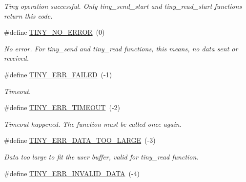 \begin{DoxyCompactItemize}
\begin{DoxyCompactList}\small\item\em Tiny operation successful. Only tiny\+\_\+send\+\_\+start and tiny\+\_\+read\+\_\+start functions return this code. \end{DoxyCompactList}\item 
\hypertarget{group__ERROR__FLAGS_ga69c869a686b67bf0b7b8115599515d61}{}\#define \hyperlink{group__ERROR__FLAGS_ga69c869a686b67bf0b7b8115599515d61}{T\+I\+N\+Y\+\_\+\+N\+O\+\_\+\+E\+R\+R\+O\+R}~(0)\label{group__ERROR__FLAGS_ga69c869a686b67bf0b7b8115599515d61}

\begin{DoxyCompactList}\small\item\em No error. For tiny\+\_\+send and tiny\+\_\+read functions, this means, no data sent or received. \end{DoxyCompactList}\item 
\hypertarget{group__ERROR__FLAGS_ga84e6ca143550038e1a71cf36078d1926}{}\#define \hyperlink{group__ERROR__FLAGS_ga84e6ca143550038e1a71cf36078d1926}{T\+I\+N\+Y\+\_\+\+E\+R\+R\+\_\+\+F\+A\+I\+L\+E\+D}~(-\/1)\label{group__ERROR__FLAGS_ga84e6ca143550038e1a71cf36078d1926}

\begin{DoxyCompactList}\small\item\em Timeout. \end{DoxyCompactList}\item 
\hypertarget{group__ERROR__FLAGS_gac9ba8076a1eb8613e8d1f07629ff0cd1}{}\#define \hyperlink{group__ERROR__FLAGS_gac9ba8076a1eb8613e8d1f07629ff0cd1}{T\+I\+N\+Y\+\_\+\+E\+R\+R\+\_\+\+T\+I\+M\+E\+O\+U\+T}~(-\/2)\label{group__ERROR__FLAGS_gac9ba8076a1eb8613e8d1f07629ff0cd1}

\begin{DoxyCompactList}\small\item\em Timeout happened. The function must be called once again. \end{DoxyCompactList}\item 
\hypertarget{group__ERROR__FLAGS_ga7bbe7440d11ad304b0af68e011f4eab7}{}\#define \hyperlink{group__ERROR__FLAGS_ga7bbe7440d11ad304b0af68e011f4eab7}{T\+I\+N\+Y\+\_\+\+E\+R\+R\+\_\+\+D\+A\+T\+A\+\_\+\+T\+O\+O\+\_\+\+L\+A\+R\+G\+E}~(-\/3)\label{group__ERROR__FLAGS_ga7bbe7440d11ad304b0af68e011f4eab7}

\begin{DoxyCompactList}\small\item\em Data too large to fit the user buffer, valid for tiny\+\_\+read function. \end{DoxyCompactList}\item 
\hypertarget{group__ERROR__FLAGS_ga541a9e67a84e39595ad647d641c4df2e}{}\#define \hyperlink{group__ERROR__FLAGS_ga541a9e67a84e39595ad647d641c4df2e}{T\+I\+N\+Y\+\_\+\+E\+R\+R\+\_\+\+I\+N\+V\+A\+L\+I\+D\+\_\+\+D\+A\+T\+A}~(-\/4)\label{group__ERROR__FLAGS_ga541a9e67a84e39595ad647d641c4df2e}


\end{DoxyCompactItemize}
